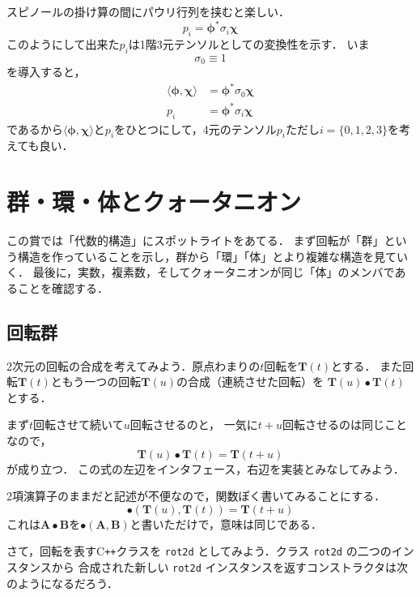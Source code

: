 \documentclass{jsbook}
\newcommand{\cxx}{\textrm{C}\texttt{++}}
\newcommand{\ccode}[1]{\texttt{#1}}
\newcommand{\bvec}[1]{\boldsymbol{#1}}
\newcommand{\bop}[1]{\boldsymbol{#1}}
\newcommand{\One}{1}%
\begin{document}
スピノールの掛け算の間にパウリ行列を挟むと楽しい．
\begin{equation}
p_i=\bvec{\phi}^*\sigma_i\bvec{\chi}
\end{equation}
このようにして出来た$p_i$は1階3元テンソルとしての変換性を示す．
いま
\begin{equation}
\sigma_0\equiv\One
\end{equation}
を導入すると，
\begin{align}
\langle\bvec{\phi},\bvec{\chi}\rangle&=\bvec{\phi}^*\sigma_0\bvec{\chi}\\
p_i&=\bvec{\phi}^*\sigma_i\bvec{\chi}
\end{align}
であるから$\langle\bvec{\phi},\bvec{\chi}\rangle$と$p_i$をひとつにして，4元のテンソル$p_i$ただし$i=\{0,1,2,3\}$を考えても良い．

\chapter{群・環・体とクォータニオン}

この賞では「代数的構造」にスポットライトをあてる．
まず回転が「群」という構造を作っていることを示し，群から「環」「体」とより複雑な構造を見ていく．
最後に，実数，複素数，そしてクォータニオンが同じ「体」のメンバであることを確認する．

\section{回転群}

2次元の回転の合成を考えてみよう．原点わまりの$t$回転を$\bop{T}(t)$とする．
また回転$\bop{T}(t)$ともう一つの回転$\bop{T}(u)$の合成（連続させた回転）を
$\bop{T}(u)\bullet\bop{T}(t)$とする．

まず$t$回転させて続いて$u$回転させるのと，
一気に$t+u$回転させるのは同じことなので，
\begin{equation}
\bop{T}(u)\bullet\bop{T}(t)=\bop{T}(t+u)
\end{equation}
が成り立つ．
この式の左辺をインタフェース，右辺を実装とみなしてみよう．

2項演算子のままだと記述が不便なので，関数ぽく書いてみることにする．
\begin{equation}
\bullet(\bop{T}(u),\bop{T}(t))=\bop{T}(t+u)
\end{equation}
これは$\bop{A}\bullet\bop{B}$を$\bullet(\bop{A},\bop{B})$と書いただけで，意味は同じである．

さて，回転を表す\cxx クラスを \ccode{rot2d} としてみよう．クラス \ccode{rot2d} の二つのインスタンスから
合成された新しい \ccode{rot2d} インスタンスを返すコンストラクタは次のようになるだろう．
\end{document}
